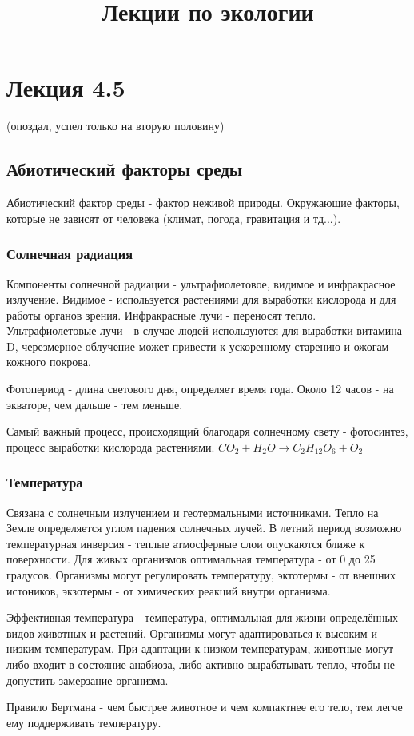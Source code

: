 \title{Лекции по экологии}
\chapter{Лекция 4.5}
(опоздал, успел только на вторую половину)
\section{Абиотический факторы среды}
Абиотический фактор среды - фактор неживой природы. Окружающие факторы, которые не зависят от человека (климат, погода, гравитация и тд...).
\subsection{Солнечная радиация}
Компоненты солнечной радиации - ультрафиолетовое, видимое и инфракрасное излучение. Видимое - используется растениями для выработки кислорода и для работы органов зрения. Инфракрасные лучи - переносят тепло. Ультрафиолетовые лучи - в случае людей используются для выработки витамина D, черезмерное облучение может привести к ускоренному старению и ожогам кожного покрова. 

Фотопериод - длина светового дня, определяет время года. Около 12 часов - на экваторе, чем дальше - тем меньше. 

Самый важный процесс, происходящий благодаря солнечному свету - фотосинтез, процесс выработки кислорода растениями.
$CO_{2} + H_{2}O \rightarrow C_{2}H_{12}O_{6} + O_{2}$

\subsection{Температура}
Связана с солнечным излучением и геотермальными источниками. Тепло на Земле определяется углом падения солнечных лучей. В летний период возможно температурная инверсия - теплые атмосферные слои опускаются ближе к поверхности. Для живых организмов оптимальная температура - от 0 до 25 градусов. Организмы могут регулировать температуру, эктотермы - от внешних истоников, экзотермы - от химических реакций внутри организма.

Эффективная температура - температура, оптимальная для жизни определённых видов животных и растений. Организмы могут адаптироваться к высоким и низким температурам. При адаптации к низком температурам, животные могут либо входит в состояние анабиоза, либо активно вырабатывать тепло, чтобы не допустить замерзание организма.

Правило Бертмана - чем быстрее животное и чем компактнее его тело, тем легче ему поддерживать температуру.

